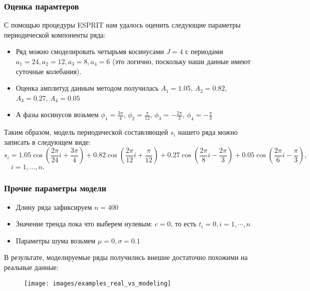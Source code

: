 \documentclass[intlimits, 9pt, unicode]{beamer}
\begin{document}
\begin{frame}
\frametitle{Оценка парамтеров}

С помощью процедуры ESPRIT нам удалось оценить следующие параметры периодической компоненты ряда:

\begin{itemize}
	\item Ряд можно смоделировать четырьмя косинусами $J=4$ с периодами $a_1 = 24, a_2 = 12, a_3 = 8, a_4 = 6$ (это логично, поскольку наши данные имеют суточные колебания).
	\item Оценка амплитуд данным методом получилась $A_1 = 1.05$, $A_2 = 0.82$, $A_3 = 0.27$, $A_4 = 0.05$
	\item А фазы косинусов возьмем $\phi_1 = \frac{3\pi}{4}$, $\phi_2 = \frac{\pi}{12}$, $\phi_3 = -\frac{2\pi}{3}$, $\phi_4 = -\frac{\pi}{3}$
\end{itemize}

Таким образом, модель периодической составляющей $s_i$ нашего ряда можно записать в следующем виде:
$$ s_i = 1.05\cos(\frac{2\pi}{24}i + \frac{3\pi}{4}) + 
                    0.82\cos(\frac{2\pi}{12}i + \frac{\pi}{12}) + 
                    0.27\cos(\frac{2\pi}{8}i - \frac{2\pi}{3}) + 
                    0.05\cos(\frac{2\pi}{6}i - \frac{\pi}{3}),$$
$\quad i = 1, \dots, n.$

\end{frame}

\begin{frame}
\frametitle{Прочие параметры модели}

\begin{itemize}
	\item Длину ряда зафиксируем $n = 400$
	\item Значение тренда пока что выберем нулевым: $c = 0$, то есть $t_i = 0, i = 1,\cdots, n$
	\item Параметры шума возьмем $\mu = 0, \sigma = 0.1$
\end{itemize}

В результате, моделируемые ряды получились внешне достаточно похожими на реальные данные:

\begin{figure}
\texttt{[image: images/examples\_real\_vs\_modeling]}
\end{figure}
\end{frame}
\end{document}
